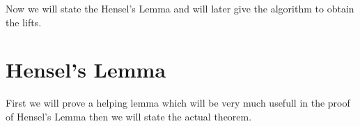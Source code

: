 Now we will state the Hensel's Lemma and will later give the algorithm to obtain the lifts.
\section{Hensel's Lemma}
First we will prove a helping lemma which will be very much usefull in the proof of Hensel's Lemma  then we will state the actual theorem.

